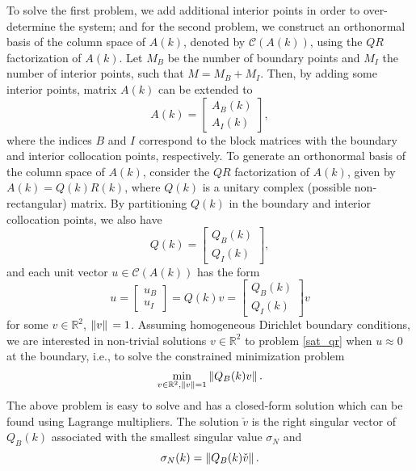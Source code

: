 To solve the first problem, we add additional interior points in order to over-determine the system; and for the second problem, we construct an orthonormal basis of the column space of \(A(k)\), denoted by \(\mathcal{C}(A(k))\), using the \(QR\) factorization of \(A(k)\). Let \(M_B\) be the number of boundary points and \(M_I\) the number of interior points, such that \(M=M_B+M_I\). Then, by adding some interior points, matrix \(A(k)\) can be extended to
\[
    A(k) = \begin{bmatrix}
        A_B(k)\\
        A_I(k)
    \end{bmatrix},
\]
where the indices \(B\) and \(I\) correspond to the block matrices with the boundary and interior collocation points, respectively. To generate an orthonormal basis of the column space of \(A(k)\), consider the \(QR\) factorization of \(A(k)\), given by \(A(k)=Q(k)R(k)\), where \(Q(k)\) is a unitary complex (possible non-rectangular) matrix. By partitioning \(Q(k)\) in the boundary and interior collocation points, we also have
\begin{equation*}
    Q(k) = \begin{bmatrix}
        Q_B(k)\\
        Q_I(k)
    \end{bmatrix},
\end{equation*}
and each unit vector \(u \in \mathcal{C}(A(k))\) has the form
\begin{equation}\label{sat_qr}
    u = \begin{bmatrix}
        u_B\\
        u_I
    \end{bmatrix} = Q(k)v = \begin{bmatrix}
        Q_B(k)\\
        Q_I(k)
    \end{bmatrix}v
\end{equation}
for some \(v \in \mathbb{R}^2\), \(\norm*{v} = 1\). Assuming homogeneous Dirichlet boundary conditions, we are interested in non-trivial solutions \(v \in \mathbb{R}^2\) to problem \eqref{sat_qr} when \(u \approx 0\) at the boundary, i.e., to solve the constrained minimization problem
\[
    \min_{v \in \mathbb{R}^2, \norm*{v}=1} \norm*{Q_B(k) v}. 
\]
The above problem is easy to solve and has a closed-form solution which can be found using Lagrange multipliers. The solution \(\check{v}\) is the right singular vector of \(Q_B(k)\) associated with the smallest singular value \(\sigma_N\) and
\[
    \sigma_N(k) = \norm*{Q_B(k) \check{v}}.
\]
